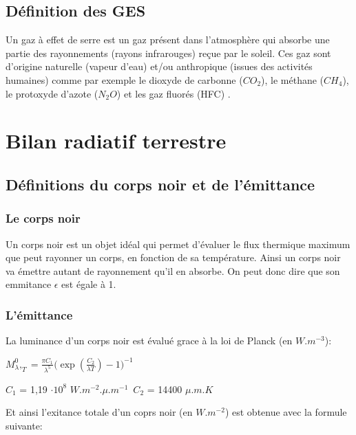 \documentclass[a4paper, 12pt]{report} %
\begin{document}
\subsection{Définition des GES}
Un gaz à effet de serre est un gaz présent dans l'atmosphère qui 
absorbe une partie des rayonnements (rayons infrarouges) 
reçue par le soleil. Ces gaz sont d'origine naturelle 
(vapeur d'eau) et/ou anthropique 
(issues des activités humaines) comme par exemple le dioxyde 
de carbonne ($CO_2$), le méthane ($CH_4$), le protoxyde d'azote
($N_2O$) et les gaz fluorés (HFC) . \vspace{\baselineskip}


\section{Bilan radiatif terrestre}
\subsection{Définitions du corps noir et de l'émittance}

\subsubsection{Le corps noir}
Un corps noir est un objet idéal qui permet d'évaluer le flux thermique maximum
que peut rayonner un corps, en fonction de sa température. Ainsi un corps noir 
va émettre autant de rayonnement qu'il en absorbe. On peut donc dire que son 
emmitance $ \epsilon$  est égale à 1. 

\subsubsection{L'émittance} 

La luminance d'un corps noir est évalué grace à la loi de Planck 
(en $W.m^{-3}$): \vspace{\baselineskip}

\begin{center}
$M^{0}_\lambda,_T= \frac{\pi C_1}{\lambda^5} \biggl(\exp(\frac{C_2}{\lambda T}) - 1\biggr)^{-1}$ 

$C_1$ = 1,19 $\cdot 10^{8}$ $W.m^{-2}.\mu.m^{-1}$\
$C_2$ = 14400 $\mu.m.K$ \\
\end{center}
Et ainsi l'exitance totale d'un coprs noir (en $W.m^{-2}$) est obtenue avec la formule suivante:
\end{document}

